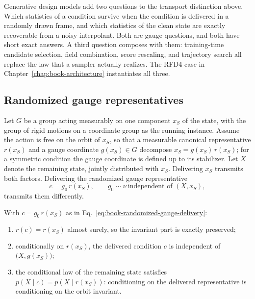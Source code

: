 Generative design models add two questions to the transport distinction above.  Which statistics
of a condition survive when the condition is delivered in a randomly drawn frame, and which
statistics of the clean state are exactly recoverable from a noisy interpolant.  Both are gauge
questions, and both have short exact answers.  A third question composes with them:
training-time candidate selection, field combination, score rescaling, and trajectory search all
replace the law that a sampler actually realizes.  The RFD4 case in
Chapter~\ref{chap:book-architecture} instantiates all three.

\subsection{Randomized gauge representatives}

Let $G$ be a group acting measurably on one component $x_S$ of the state, with the group of rigid
motions on a coordinate group as the running instance.  Assume the action is free on the orbit of
$x_S$, so that a measurable canonical representative $r(x_S)$ and a gauge coordinate
$g(x_S)\in G$ decompose $x_S=g(x_S)\,r(x_S)$; for a symmetric condition the gauge coordinate is
defined up to its stabilizer.  Let $X$ denote the remaining state, jointly distributed with
$x_S$.  Delivering $x_S$ transmits both factors.  Delivering the randomized gauge representative
\begin{equation}
c=g_0\,r(x_S),\qquad g_0\sim\nu\ \text{independent of }(X,x_S),
\label{eq:book-randomized-gauge-delivery}
\end{equation}
transmits them differently.

\begin{proposition}
\label{prop:randomized-gauge}
With $c=g_0\,r(x_S)$ as in Eq.~\ref{eq:book-randomized-gauge-delivery}:
\begin{enumerate}
\item $r(c)=r(x_S)$ almost surely, so the invariant part is exactly preserved;
\item conditionally on $r(x_S)$, the delivered condition $c$ is independent of
$\bigl(X,g(x_S)\bigr)$;
\item the conditional law of the remaining state satisfies
$p(X\mid c)=p(X\mid r(x_S))$: conditioning on the delivered representative is conditioning on
the orbit invariant.
\end{enumerate}
\end{proposition}

